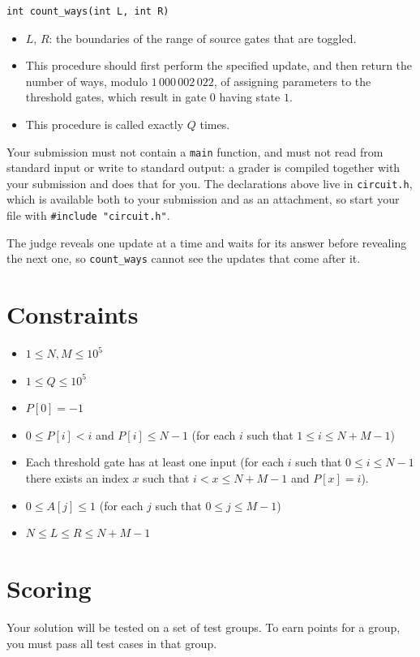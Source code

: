 \begin{verbatim}
int count_ways(int L, int R)
\end{verbatim}

\begin{itemize}
  \item $L$, $R$: the boundaries of the range of source gates that are toggled.
  \item This procedure should first perform the specified update, and then return the number of ways,
  modulo $1\,000\,002\,022$, of assigning parameters to the threshold gates, which result in gate $0$
  having state $1$.
  \item This procedure is called exactly $Q$ times.
\end{itemize}

Your submission must not contain a \texttt{main} function, and must not read from standard input or
write to standard output: a grader is compiled together with your submission and does that for you.
The declarations above live in \texttt{circuit.h}, which is available both to your submission and as
an attachment, so start your file with \texttt{\#include "circuit.h"}.

The judge reveals one update at a time and waits for its answer before revealing the next one, so
\texttt{count\_ways} cannot see the updates that come after it.

\section*{Constraints}
\begin{itemize}
  \item $1 \leq N, M \leq 10^5$
  \item $1 \leq Q \leq 10^5$
  \item $P[0] = -1$
  \item $0 \leq P[i] < i$ and $P[i] \leq N-1$ (for each $i$ such that $1 \leq i \leq N + M - 1$)
  \item Each threshold gate has at least one input (for each $i$ such that $0 \leq i \leq N-1$ there
  exists an index $x$ such that $i < x \leq N + M - 1$ and $P[x] = i$).
  \item $0 \leq A[j] \leq 1$ (for each $j$ such that $0 \leq j \leq M-1$)
  \item $N \leq L \leq R \leq N + M - 1$
\end{itemize}

\section*{Scoring}
Your solution will be tested on a set of test groups.
To earn points for a group, you must pass all test cases in that group.

